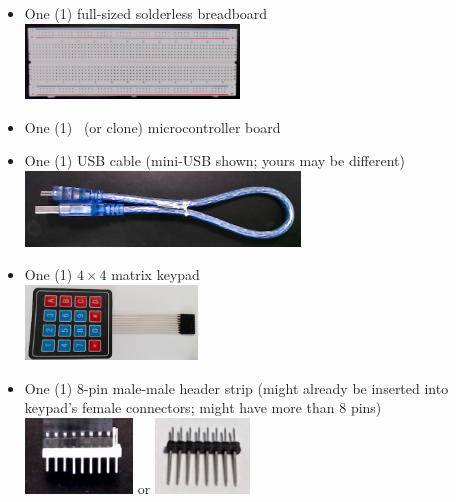 \begin{itemize}
    \item One (1) full-sized solderless breadboard \\
        \includegraphics[height=2cm]{inventory/breadboard}
    \item One (1) \developmentboard\ (or clone) microcontroller board \\
        \devboardimage
    \item One (1) USB cable (mini-USB shown;
        yours may be different) \\
        \includegraphics[height=2cm]{inventory/usb}
    \nandchipitem
    \item One (1) $4 \times 4$ matrix keypad \\
        \includegraphics[height=2cm]{inventory/keypad}
    \item One (1) 8-pin male-male header strip (might already be inserted into keypad's female connectors;
        might have more than 8 pins) \\
        \includegraphics[height=2cm]{inventory/keypad-header-in-connector} \hspace{1cm} or
        \hspace{1cm} \includegraphics[height=2cm]{inventory/keypad-header-without-connector}

\end{itemize}
